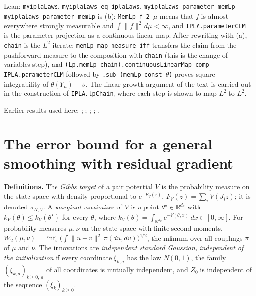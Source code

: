 \documentclass[11pt,a4paper]{article}
\begin{document}
\begin{leanbox}{Lean: \texttt{myiplaLaws}, \texttt{myiplaLaws\_\allowbreak{}eq\_\allowbreak{}iplaLaws}, \texttt{myiplaLaws\_\allowbreak{}parameter\_\allowbreak{}memLp}}
\texttt{myipla\allowbreak{}Laws\_\allowbreak{}parameter\_\allowbreak{}mem\allowbreak{}Lp} is (b): \texttt{Mem\allowbreak{}Lp f 2 \ensuremath{\mu}} means that \(f\) is almost-everywhere strongly measurable and \(\int\|f\|^2\,d\mu<\infty\), and \texttt{IPLA.\allowbreak{}parameter\allowbreak{}CLM} is the parameter projection as a continuous linear map. After rewriting with (a), \texttt{chain} is the \(L^2\) iterate; \texttt{mem\allowbreak{}Lp\_\allowbreak{}map\_\allowbreak{}measure\_\allowbreak{}iff} transfers the claim from the pushforward measure to the composition with \texttt{chain} (this is the change-of-variables step), and \texttt{(Lp.\allowbreak{}mem\allowbreak{}Lp chain).\allowbreak{}continuous\allowbreak{}Linear\allowbreak{}Map\_\allowbreak{}comp IPLA.\allowbreak{}parameter\allowbreak{}CLM} followed by \texttt{.\allowbreak{}sub (mem\allowbreak{}Lp\_\allowbreak{}const \ensuremath{\theta})} proves square-integrability of \(\theta(Y_n)-\vartheta\). The linear-growth argument of the text is carried out in the construction of \texttt{IPLA.\allowbreak{}lp\allowbreak{}Chain}, where each step is shown to map \(L^2\) to \(L^2\).
\end{leanbox}


Earlier results used here: \cite[Section~3.1.1]{LangevinLean2026IPLA}; \cite[Section~3.1.4]{LangevinLean2026IPLA}; \cite[Section~3.1.6]{LangevinLean2026IPLA}; \cite[Section~3.3.3]{LangevinLean2026IPLA}; \cite[Section~3.4.3]{LangevinLean2026IPLA}.

\section{\texorpdfstring{The error bound for a general smoothing with residual gradient}{The error bound for a general smoothing with residual gradient}}


\textbf{Definitions.} The \emph{Gibbs target} of a pair potential \(V\) is the probability measure on the state space with density proportional to \(e^{-F_V(z)}\), \(F_V(z)=\sum_iV(J_iz)\); it is denoted \(\pi_{N,V}\). A \emph{marginal maximizer} of \(V\) is a point \(\theta^\star\in\mathbb R^{d_\theta}\) with \(k_V(\theta)\le k_V(\theta^\star)\) for every \(\theta\), where \(k_V(\theta)=\int_{\mathbb R^{d_x}}e^{-V(\theta,x)}\,dx\in[0,\infty]\). For probability measures \(\mu,\nu\) on the state space with finite second moments, \(W_2(\mu,\nu)=\inf_\pi\bigl(\int\|u-v\|^2\,\pi(du,dv)\bigr)^{1/2}\), the infimum over all couplings \(\pi\) of \(\mu\) and \(\nu\). The innovations are \emph{independent standard Gaussian, independent of the initialization} if every coordinate \(\xi_{k,a}\) has the law \(N(0,1)\), the family \((\xi_{k,a})_{k\ge0,\,a}\) of all coordinates is mutually independent, and \(Z_0\) is independent of the sequence \((\xi_k)_{k\ge0}\).
\end{document}
